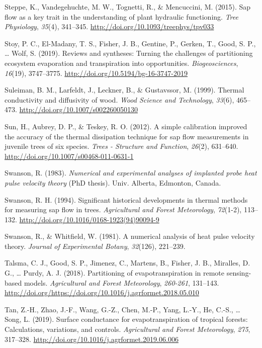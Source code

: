\documentclass[11pt,twoside]{reedthesis}
\begin{document}
\hypertarget{ref-Steppe2015}{}
Steppe, K., Vandegehuchte, M. W., Tognetti, R., \& Mencuccini, M.
(2015). Sap flow as a key trait in the understanding of plant hydraulic
functioning. \emph{Tree Physiology}, \emph{35}(4), 341--345.
\url{http://doi.org/10.1093/treephys/tpv033}

\hypertarget{ref-Stoy2019}{}
Stoy, P. C., El-Madany, T. S., Fisher, J. B., Gentine, P., Gerken, T.,
Good, S. P., \ldots{} Wolf, S. (2019). Reviews and syntheses: Turning
the challenges of partitioning ecosystem evaporation and transpiration
into opportunities. \emph{Biogeosciences}, \emph{16}(19), 3747--3775.
\url{http://doi.org/10.5194/bg-16-3747-2019}

\hypertarget{ref-Suleiman1999}{}
Suleiman, B. M., Larfeldt, J., Leckner, B., \& Gustavssor, M. (1999).
Thermal conductivity and diffusivity of wood. \emph{Wood Science and
Technology}, \emph{33}(6), 465--473.
\url{http://doi.org/10.1007/s002260050130}

\hypertarget{ref-Sun2012}{}
Sun, H., Aubrey, D. P., \& Teskey, R. O. (2012). A simple calibration
improved the accuracy of the thermal dissipation technique for sap flow
measurements in juvenile trees of six species. \emph{Trees - Structure
and Function}, \emph{26}(2), 631--640.
\url{http://doi.org/10.1007/s00468-011-0631-1}

\hypertarget{ref-Swanson1983}{}
Swanson, R. (1983). \emph{Numerical and experimental analyses of
implanted probe heat pulse velocity theory} (PhD thesis). Univ. Alberta,
Edmonton, Canada.

\hypertarget{ref-Swanson1994}{}
Swanson, R. H. (1994). Significant historical developments in thermal
methods for measuring sap flow in trees. \emph{Agricultural and Forest
Meteorology}, \emph{72}(1-2), 113--132.
\url{http://doi.org/10.1016/0168-1923(94)90094-9}

\hypertarget{ref-Swanson1981}{}
Swanson, R., \& Whitfield, W. (1981). A numerical analysis of heat pulse
velocity theory. \emph{Journal of Experimental Botany}, \emph{32}(126),
221--239.

\hypertarget{ref-Talsma2018}{}
Talsma, C. J., Good, S. P., Jimenez, C., Martens, B., Fisher, J. B.,
Miralles, D. G., \ldots{} Purdy, A. J. (2018). Partitioning of
evapotranspiration in remote sensing-based models. \emph{Agricultural
and Forest Meteorology}, \emph{260-261}, 131--143.
\url{http://doi.org/https://doi.org/10.1016/j.agrformet.2018.05.010}

\hypertarget{ref-tan_surface_2019}{}
Tan, Z.-H., Zhao, J.-F., Wang, G.-Z., Chen, M.-P., Yang, L.-Y., He,
C.-S., \ldots{} Song, L. (2019). Surface conductance for
evapotranspiration of tropical forests: Calculations, variations, and
controls. \emph{Agricultural and Forest Meteorology}, \emph{275},
317--328. \url{http://doi.org/10.1016/j.agrformet.2019.06.006}
\end{document}
